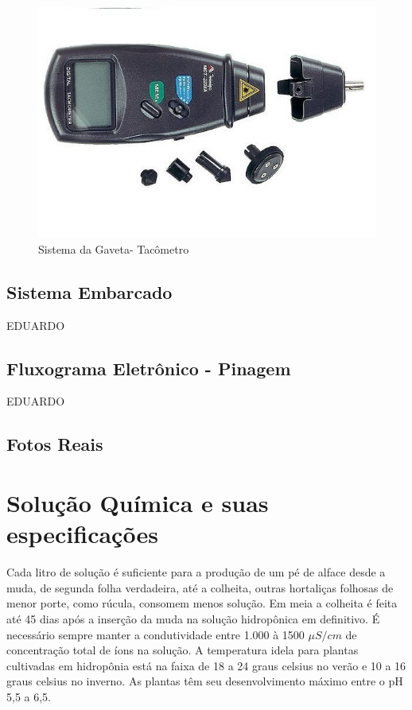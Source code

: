 \begin{figure}[!htb]
	\centering
	\includegraphics[scale=0.35]{figuras/5.jpg} 
	\caption{Sistema da Gaveta- Tacômetro}
	\label{Rotulo}
\end{figure}

\subsection{Sistema Embarcado}

EDUARDO
\subsection{Fluxograma Eletrônico - Pinagem}
EDUARDO
\subsection{Fotos Reais}

\section{Solução Química e suas especificações}

Cada litro de solução é suficiente para a produção de um pé de alface desde a muda, de segunda folha verdadeira, até a colheita, outras hortaliças folhosas de menor porte, como rúcula, consomem menos solução. Em meia a colheita é feita até 45 dias após a inserção da muda na solução hidropônica em definitivo. É necessário sempre manter a condutividade entre 1.000 à 1500 $\mu S/cm$ de concentração total de íons na solução. A temperatura idela para plantas cultivadas em hidropônia está na faixa de 18 a 24 graus celsius no verão e 10 a 16 graus celsius no inverno. As plantas têm seu desenvolvimento máximo entre o pH 5,5 a 6,5.

